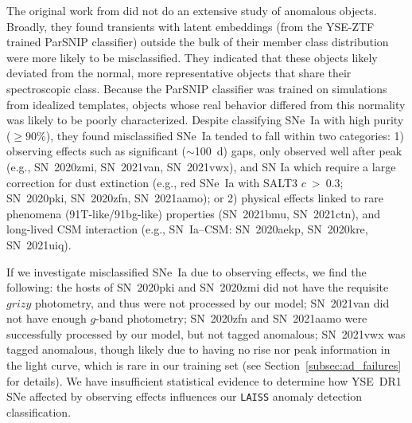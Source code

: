 \documentclass[twocolumn]{aastex63}
\newcommand{\laiss}{\texttt{LAISS}}
\begin{document}
The original work from \cite{Aleo2023} did not do an extensive study of anomalous objects. Broadly, they found transients with latent embeddings (from the YSE-ZTF trained ParSNIP classifier) outside the bulk of their member class distribution were more likely to be misclassified. They indicated that these objects likely deviated from the normal, more representative objects that share their spectroscopic class. Because the ParSNIP classifier was trained on simulations from idealized templates, objects whose real behavior differed from this normality was likely to be poorly characterized. Despite classifying SNe~Ia with high purity ($\geq90\%$), they found misclassified SNe~Ia tended to fall within two categories: 1) observing effects such as significant ($\sim$100~d) gaps, only observed well after peak (e.g., SN~2020zmi, SN~2021van, SN~2021vwx), and SN Ia which require a large correction for dust extinction (e.g., red SNe~Ia with SALT3 $c$~\textgreater~0.3; SN~2020pki, SN~2020zfn, SN~2021aamo); or 2) physical effects linked to rare phenomena (91T-like/91bg-like) properties (SN~2021bmu, SN~2021ctn), and long-lived CSM interaction (e.g., SN~Ia–CSM: SN~2020aekp, SN~2020kre, SN~2021uiq).  \par

If we investigate misclassified SNe~Ia due to observing effects, we find the following: the hosts of SN~2020pki and SN~2020zmi did not have the requisite $grizy$ photometry, and thus were not processed by our model; SN~2021van did not have enough $g$-band photometry; SN~2020zfn and SN~2021aamo were successfully processed by our model, but not tagged anomalous; SN~2021vwx was tagged anomalous, though likely due to having no rise nor peak information in the light curve, which is rare in our training set (see Section~\ref{subsec:ad_failures} for details). We have insufficient statistical evidence to determine how YSE~DR1 SNe affected by observing effects influences our \laiss{} anomaly detection classification. \par
\end{document}
